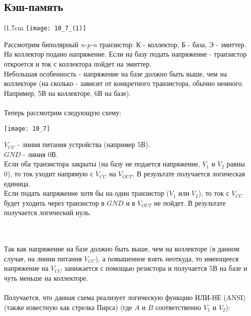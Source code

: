 \subsection{Кэш-память}
\begin{wrapfigure}[7]{l}{1.7cm}
\texttt{[image: 10\_7\_(1)]}
\end{wrapfigure}
Рассмотрим биполярный \emph{n-p-n} транзистор: К - коллектор, Б - база, Э - эмиттер. На коллектор подано напряжение. Если на базу подать напряжение - транзистор откроется и ток с коллектора пойдет на эмиттер.
\\Небольшая особенность - напряжение на базе должно быть выше, чем на коллекторе (на сколько - зависит от конкретного транзистора, обычно немного. Например, 5В на коллекторе, 6В на базе).
\\
\\Теперь рассмотрим следующую схему:
\\
\begin{minipage}[l]{5cm}
\texttt{[image: 10\_7]}
\end{minipage}
\begin{minipage}[l]{7cm}
$V_{CC}$ - линия питания устройства (например 5В).
\\$GND$ - линия 0В.
\\Если оба транзистора закрыты (на базу не подается напряжение, $V_1$ и $V_2$ равны 0), то ток уходит напрямую с $V_{CC}$ на $V_{OUT}$. В результате получается логическая единица.
\\Если подать напряжение хотя бы на один транзистор ($V_1$ или $V_2$), то ток с $V_{CC}$ будет уходить через транзистор в $GND$ и в $V_{OUT}$ не пойдет. В результате получается логический нуль.
\end{minipage}
\\
\\Так как напряжение на базе должно быть выше, чем на коллекторе (в данном случае, на линии питания $V_{CC}$), а повышенное взять неоткуда, то имеющееся напряжение на $V_{CC}$ занижается с помощью резистора и получается 5В на базе и чуть меньше на коллекторе.
\\
\\Получается, что данная схема реализует логическую функцию ИЛИ-НЕ (ANSI) (также известную как стрелка Пирса) (где $A$ и $B$ соответственно $V_1$ и $V_2$):

